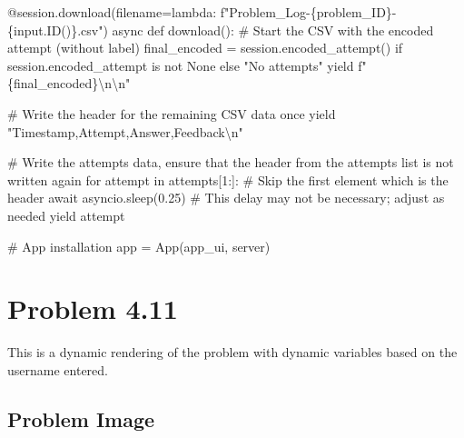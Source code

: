 \documentclass[
  letterpaper,
  DIV=11,
  numbers=noendperiod]{scrreprt}
\newenvironment{Shaded}{\begin{snugshade}}{\end{snugshade}}
\newcommand{\NormalTok}[1]{\textcolor[rgb]{0.00,0.23,0.31}{#1}}
\begin{document}
\begin{Shaded}
\begin{Highlighting}[]
\NormalTok{    @session.download(filename=lambda: f"Problem\_Log{-}\{problem\_ID\}{-}\{input.ID()\}.csv")}
\NormalTok{    async def download():}
\NormalTok{        \# Start the CSV with the encoded attempt (without label)}
\NormalTok{        final\_encoded = session.encoded\_attempt() if session.encoded\_attempt is not None else "No attempts"}
\NormalTok{        yield f"\{final\_encoded\}\textbackslash{}n\textbackslash{}n"}
        
\NormalTok{        \# Write the header for the remaining CSV data once}
\NormalTok{        yield "Timestamp,Attempt,Answer,Feedback\textbackslash{}n"}
        
\NormalTok{        \# Write the attempts data, ensure that the header from the attempts list is not written again}
\NormalTok{        for attempt in attempts[1:]:  \# Skip the first element which is the header}
\NormalTok{            await asyncio.sleep(0.25)  \# This delay may not be necessary; adjust as needed}
\NormalTok{            yield attempt}


\NormalTok{\# App installation}
\NormalTok{app = App(app\_ui, server)}
\end{Highlighting}
\end{Shaded}

\chapter*{Problem 4.11}\label{problem-4.11}


This is a dynamic rendering of the problem with dynamic variables based
on the username entered.

\section*{Problem Image}\label{problem-image-27}

\end{document}

